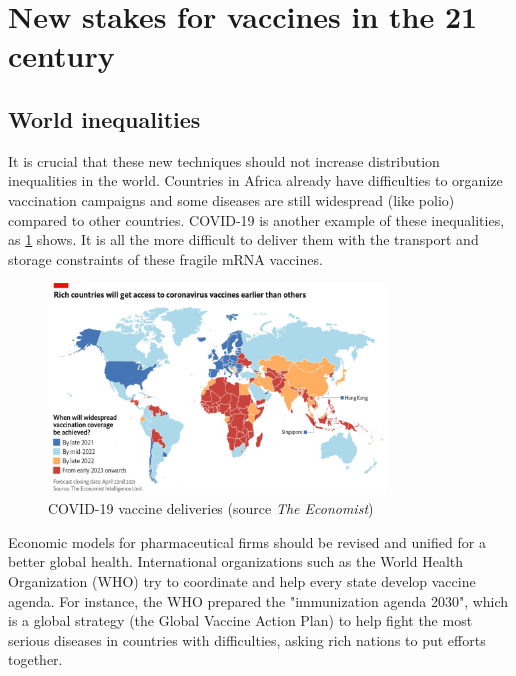 \documentclass{article}
\begin{document}
    \section{New stakes for vaccines in the 21 century}

        \subsection{World inequalities}

            It is crucial that these new techniques should not increase distribution inequalities in the world.
            Countries in Africa already have difficulties to organize vaccination campaigns and some diseases are still widespread (like polio) compared to other countries.
            COVID-19 is another example of these inequalities, as \ref{fig:world_ineq} shows. It is all the more difficult to deliver them
                with the transport and storage constraints of these fragile mRNA vaccines.
            
                \begin{figure}
                    \centering
                    \includegraphics[width=0.8\textwidth]{imgs/Inequalities.png}
                    \caption{COVID-19 vaccine deliveries (source \emph{The Economist})}
                    \label{fig:world_ineq}
                \end{figure}

            Economic models for pharmaceutical firms should be revised and unified for a better global health.
            International organizations such as the World Health Organization (WHO) try to coordinate and help every state develop vaccine agenda.
            For instance, the WHO prepared the "immunization agenda 2030", which is a global strategy (the Global Vaccine Action Plan) 
                to help fight the most serious diseases in countries with difficulties,
                asking rich nations to put efforts together.
\end{document}
